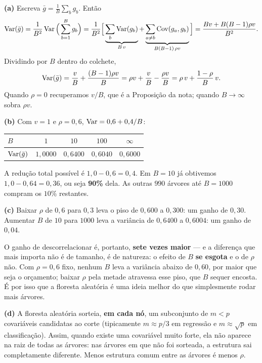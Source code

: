 \documentclass[11pt,a4paper]{article}
\begin{document}
\begin{solucao}
\textbf{(a)} Escreva $\bar g=\frac1B\sum_b g_b$. Então
\[
  \operatorname{Var}(\bar g) = \frac{1}{B^2}\operatorname{Var}\Big(\sum_{b=1}^B g_b\Big)
   = \frac{1}{B^2}\Big[\underbrace{\sum_{b}\operatorname{Var}(g_b)}_{B\,v}
       + \underbrace{\sum_{a\neq b}\operatorname{Cov}(g_a,g_b)}_{B(B-1)\,\rho v}\Big]
   = \frac{Bv + B(B-1)\rho v}{B^2}.
\]
Dividindo por $B$ dentro do colchete,
\[
  \operatorname{Var}(\bar g)= \frac{v}{B} + \frac{(B-1)\rho v}{B}
   = \rho v + \frac{v}{B} - \frac{\rho v}{B}
   = \rho\,v + \frac{1-\rho}{B}\,v .
\]
Quando $\rho=0$ recuperamos $v/B$, que é a Proposição da nota; quando $B\to\infty$
sobra $\rho v$.

\smallskip
\textbf{(b)} Com $v=1$ e $\rho=0{,}6$, $\operatorname{Var}=0{,}6+0{,}4/B$:
\begin{center}\small
\begin{tabular}{@{}lcccc@{}}
\toprule
$B$ & $1$ & $10$ & $100$ & $\infty$ \\
\midrule
$\operatorname{Var}(\bar g)$ & $1{,}0000$ & $0{,}6400$ & $0{,}6040$ & $0{,}6000$ \\
\bottomrule
\end{tabular}
\end{center}
A redução total possível é $1{,}0-0{,}6=0{,}4$. Em $B=10$ já obtivemos
$1{,}0-0{,}64=0{,}36$, ou seja \textbf{90\%} dela. As outras $990$ árvores até
$B=1000$ compram os $10\%$ restantes.

\smallskip
\textbf{(c)} Baixar $\rho$ de $0{,}6$ para $0{,}3$ leva o piso de $0{,}600$ a
$0{,}300$: um ganho de $0{,}30$. Aumentar $B$ de $10$ para $1000$ leva a
variância de $0{,}6400$ a $0{,}6004$: um ganho de $0{,}04$.

O ganho de descorrelacionar é, portanto, \textbf{sete vezes maior} --- e a
diferença que mais importa não é de tamanho, é de natureza: o efeito de $B$
\textbf{se esgota} e o de $\rho$ não. Com $\rho=0{,}6$ fixo, nenhum $B$ leva a
variância abaixo de $0{,}60$, por maior que seja o orçamento; baixar $\rho$ pela
metade atravessa esse piso, que $B$ sequer encosta. É por isso que a floresta
aleatória é uma ideia melhor do que simplesmente rodar mais árvores.

\smallskip
\textbf{(d)} A floresta aleatória sorteia, \textbf{em cada nó}, um subconjunto de
$m<p$ covariáveis candidatas ao corte (tipicamente $m\approx p/3$ em regressão e
$m\approx\sqrt p$ em classificação). Assim, quando existe uma covariável muito
forte, ela não aparece na raiz de todas as árvores: nas árvores em que não foi
sorteada, a estrutura sai completamente diferente. Menos estrutura comum entre as
árvores é menos $\rho$.


\end{solucao}
\end{document}
